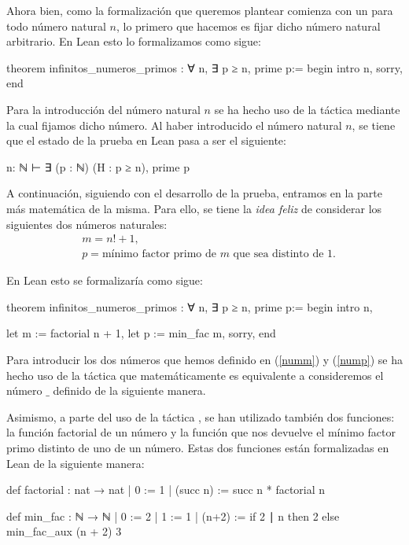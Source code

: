 Ahora bien, como la formalización que queremos plantear comienza con un
para todo número natural \(n\), lo primero que hacemos es fijar dicho
número natural arbitrario. En Lean esto lo formalizamos como sigue:
\begin{leancode}
theorem infinitos_numeros_primos : ∀ n, ∃ p ≥ n, prime p:=
begin
  intro n,
  sorry,
end
\end{leancode}

Para la introducción del número natural \(n\) se ha hecho uso de la
táctica  mediante la cual fijamos dicho número. Al
haber introducido el número natural \(n\), se tiene que el estado de la
prueba en Lean pasa a ser el siguiente:
\begin{leancode}
n: ℕ
⊢ ∃ (p : ℕ) (H : p ≥ n), prime p
\end{leancode}

A continuación, siguiendo con el desarrollo de la prueba, entramos en la
parte más matemática de la misma. Para ello, se tiene la \textit{idea
feliz} de considerar los siguientes dos números naturales:
\begin{align}
  &m = n!+1,\label{numm}\\
  &p = \text{mínimo factor primo de \(m\) que sea distinto de 1}.\label{nump}
\end{align}

En Lean esto se formalizaría como sigue:
\begin{leancode}
theorem infinitos_numeros_primos : ∀ n, ∃ p ≥ n, prime p:=
begin
  intro n,

  let m := factorial n + 1,
  let p := min_fac m,
  sorry,
end
\end{leancode}

Para introducir los dos números que hemos definido en (\ref{numm}) y
(\ref{nump}) se ha hecho uso de la táctica  que
matemáticamente es equivalente a consideremos el número \(\_\) definido de la
siguiente manera.

Asimismo, a parte del uso de la táctica , se han
utilizado también dos funciones: la función factorial de un número y la
función que nos devuelve el mínimo factor primo distinto de uno de un
número. Estas dos funciones están formalizadas en Lean de la siguiente
manera:
\begin{leancode}
def factorial : nat → nat
| 0        := 1
| (succ n) := succ n * factorial n
\end{leancode}
\begin{leancode}
def min_fac : ℕ → ℕ
  | 0 := 2
  | 1 := 1
  | (n+2) := if 2 ∣ n then 2 else min_fac_aux (n + 2) 3
\end{leancode}


